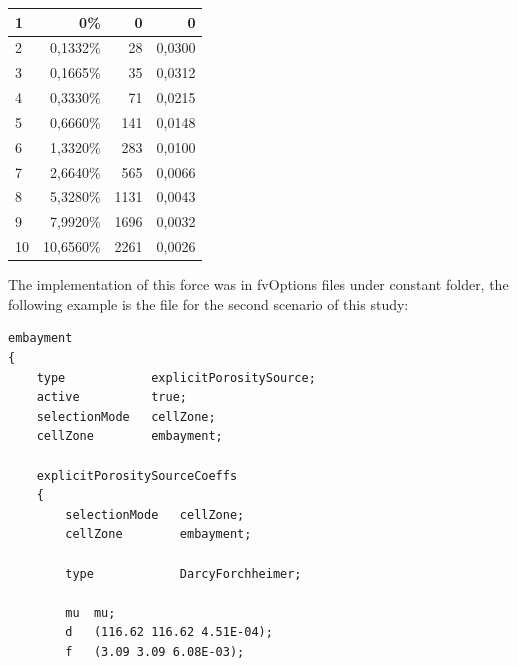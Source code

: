 \begin{refsection}
\begin{table}[!hb]
\begin{tabular}{lrrr}
1    & 0\%                                    & 0                                       & 0                                              \\ \hline
2    & 0,1332\%                               & 28                                      & 0,0300                                         \\
3    & 0,1665\%                               & 35                                      & 0,0312                                         \\
4    & 0,3330\%                               & 71                                      & 0,0215                                         \\
5    & 0,6660\%                               & 141                                     & 0,0148                                         \\
6    & 1,3320\%                               & 283                                     & 0,0100                                         \\
7    & 2,6640\%                               & 565                                     & 0,0066                                         \\
8    & 5,3280\%                               & 1131                                    & 0,0043                                         \\
9    & 7,9920\%                               & 1696                                    & 0,0032                                         \\
10   & 10,6560\%                              & 2261                                    & 0,0026                                        
\end{tabular}
\end{table}

The implementation of this force was in fvOptions files under constant folder, the following example is the file for the second scenario of this study:
\begin{lstlisting}
embayment
{
    type            explicitPorositySource;
    active			true;
	selectionMode   cellZone;
	cellZone        embayment;

    explicitPorositySourceCoeffs
    {
        selectionMode   cellZone;
        cellZone        embayment;

        type            DarcyForchheimer;
		
		mu	mu;
        d   (116.62 116.62 4.51E-04);
        f   (3.09 3.09 6.08E-03);


\end{lstlisting}
\end{refsection}
